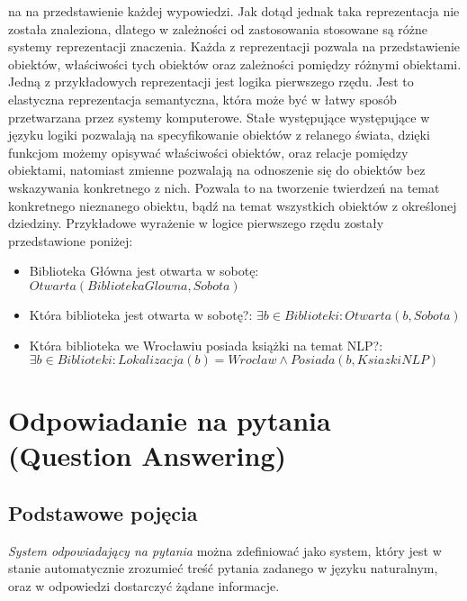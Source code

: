 \documentclass[a4paper, twoside, 12pt]{report}
\begin{document}
            na na przedstawienie każdej wypowiedzi. Jak dotąd jednak taka reprezentacja nie została znaleziona, dlatego
            w zależności od zastosowania stosowane są różne systemy reprezentacji znaczenia. Każda z reprezentacji
            pozwala na przedstawienie obiektów, właściwości tych obiektów oraz zależności pomiędzy różnymi obiektami.
            Jedną z przykładowych reprezentacji jest logika pierwszego rzędu. Jest to elastyczna reprezentacja semantyczna,
            która może być w łatwy sposób przetwarzana przez systemy komputerowe. Stałe występujące występujące w języku
            logiki pozwalają na specyfikowanie obiektów z relanego świata, dzięki funkcjom możemy opisywać właściwości
            obiektów, oraz relacje pomiędzy obiektami, natomiast zmienne pozwalają na odnoszenie się do obiektów bez wskazywania
            konkretnego z nich. Pozwala to na tworzenie twierdzeń na temat konkretnego nieznanego obiektu, bądź na temat
            wszystkich obiektów z określonej dziedziny. Przykładowe wyrażenie w logice pierwszego rzędu zostały przedstawione
            poniżej:
            \begin{itemize}
                \item Biblioteka Główna jest otwarta w sobotę: $ Otwarta(BibliotekaGlowna, Sobota) $
                \item Która biblioteka jest otwarta w sobotę?: $ \exists b \in Biblioteki: Otwarta(b, Sobota) $
                \item Która biblioteka we Wrocławiu posiada książki na temat NLP?: \\ $ \exists b \in Biblioteki: Lokalizacja(b) = Wroclaw \land Posiada(b, KsiazkiNLP) $
            \end {itemize}


    \section{Odpowiadanie na pytania (Question Answering)}
        \subsection{Podstawowe pojęcia}
            \emph{System odpowiadający na pytania} można zdefiniować jako system, który jest w stanie automatycznie
            zrozumieć treść pytania zadanego w języku naturalnym, oraz w odpowiedzi dostarczyć żądane informacje\cite{HANDBOOKNLP}.
\end{document}
